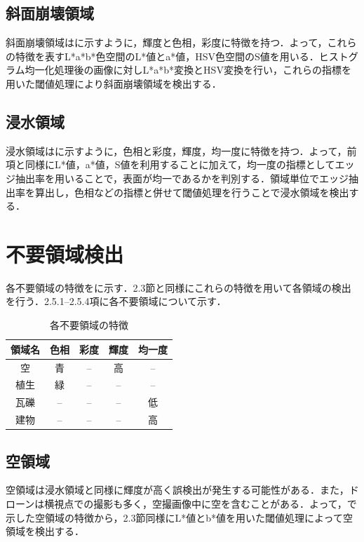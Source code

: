 \documentclass[../Thesis]{subfiles}
\begin{document}

\subsection{斜面崩壊領域}
  斜面崩壊領域はに示すように，輝度と色相，彩度に特徴を持つ．よって，これらの特徴を表すL*a*b*色空間のL*値とa*値，HSV色空間のS値を用いる．ヒストグラム均一化処理後の画像に対しL*a*b*変換とHSV変換を行い，これらの指標を用いた閾値処理により斜面崩壊領域を検出する．


\subsection{浸水領域}
  浸水領域はに示すように，色相と彩度，輝度，均一度に特徴を持つ．よって，前項と同様にL*値，a*値，S値を利用することに加えて，均一度の指標としてエッジ抽出率を用いることで，表面が均一であるかを判別する．領域単位でエッジ抽出率を算出し，色相などの指標と併せて閾値処理を行うことで浸水領域を検出する．



\section{不要領域検出}
  各不要領域の特徴をに示す．2.3節と同様にこれらの特徴を用いて各領域の検出を行う．2.5.1--2.5.4項に各不要領域について示す．
  
	\begin{table}[tbp]
		\centering
		\caption{各不要領域の特徴}
		\label{tab02}
		\begin{tabular}{c c c c c}
			\hline
			領域名 & 色相 & 彩度 & 輝度 & 均一度 \\
			\hline
			\hline
			空 & 青 & -- & 高 & -- \\
			植生 & 緑 & -- & -- & -- \\
			瓦礫 & -- & -- & -- & 低 \\
			建物 & -- & -- & -- & 高 \\ \hline
		\end{tabular}
	\end{table}


\subsection{空領域}
  空領域は浸水領域と同様に輝度が高く誤検出が発生する可能性がある．また，ドローンは横視点での撮影も多く，空撮画像中に空を含むことがある．よって，で示した空領域の特徴から，2.3節同様にL*値とb*値を用いた閾値処理によって空領域を検出する．
  
\end{document}
